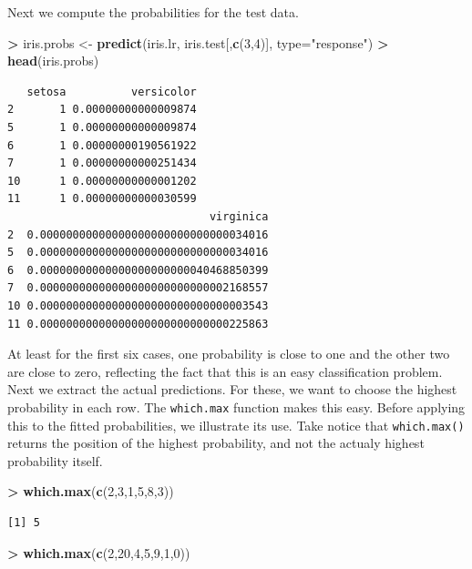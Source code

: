 \documentclass[]{krantz}
\makeatletter
\newenvironment{Shaded}{\begin{snugshade}}{\end{snugshade}}
\newcommand{\KeywordTok}[1]{\textcolor[rgb]{0.27,0.27,0.27}{\textbf{#1}}}
\newcommand{\DataTypeTok}[1]{\textcolor[rgb]{0.27,0.27,0.27}{#1}}
\newcommand{\DecValTok}[1]{\textcolor[rgb]{0.06,0.06,0.06}{#1}}
\newcommand{\StringTok}[1]{\textcolor[rgb]{0.5,0.5,0.5}{#1}}
\newcommand{\OperatorTok}[1]{\textcolor[rgb]{0.43,0.43,0.43}{\textbf{#1}}}
\newcommand{\NormalTok}[1]{#1}
\newenvironment{kframe}{%
\medskip{}
\setlength{\fboxsep}{.8em}
 \def\at@end@of@kframe{}%
 \ifinner\ifhmode%
  \def\at@end@of@kframe{\end{minipage}}%
  \begin{minipage}{\columnwidth}%
 \fi\fi%
 \def\FrameCommand##1{\hskip\@totalleftmargin \hskip-\fboxsep
 \colorbox{shadecolor}{##1}\hskip-\fboxsep
     \hskip-\linewidth \hskip-\@totalleftmargin \hskip\columnwidth}%
 \MakeFramed {\advance\hsize-\width
   \@totalleftmargin\z@ \linewidth\hsize
   \@setminipage}}%
 {\par\unskip\endMakeFramed%
 \at@end@of@kframe}
\renewenvironment{Shaded}{\begin{kframe}}{\end{kframe}}
\makeatother
\begin{document}
Next we compute the probabilities for the test data.

\begin{Shaded}
\begin{Highlighting}[]
\OperatorTok{>}\StringTok{ }\NormalTok{iris.probs <-}\StringTok{ }\KeywordTok{predict}\NormalTok{(iris.lr, iris.test[,}\KeywordTok{c}\NormalTok{(}\DecValTok{3}\NormalTok{,}\DecValTok{4}\NormalTok{)], }\DataTypeTok{type=}\StringTok{"response"}\NormalTok{)}
\OperatorTok{>}\StringTok{ }\KeywordTok{head}\NormalTok{(iris.probs)}
\end{Highlighting}
\end{Shaded}

\begin{verbatim}
   setosa          versicolor
2       1 0.00000000000009874
5       1 0.00000000000009874
6       1 0.00000000190561922
7       1 0.00000000000251434
10      1 0.00000000000001202
11      1 0.00000000000030599
                               virginica
2  0.00000000000000000000000000000034016
5  0.00000000000000000000000000000034016
6  0.00000000000000000000000040468850399
7  0.00000000000000000000000000002168557
10 0.00000000000000000000000000000003543
11 0.00000000000000000000000000000225863
\end{verbatim}

At least for the first six cases, one probability is close to one and
the other two are close to zero, reflecting the fact that this is an
easy classification problem. Next we extract the actual predictions. For
these, we want to choose the highest probability in each row. The
\texttt{which.max} function makes this easy. Before applying this to the
fitted probabilities, we illustrate its use. Take notice that
\texttt{which.max()} returns the position of the highest probability,
and not the actualy highest probability itself.

\begin{Shaded}
\begin{Highlighting}[]
\OperatorTok{>}\StringTok{ }\KeywordTok{which.max}\NormalTok{(}\KeywordTok{c}\NormalTok{(}\DecValTok{2}\NormalTok{,}\DecValTok{3}\NormalTok{,}\DecValTok{1}\NormalTok{,}\DecValTok{5}\NormalTok{,}\DecValTok{8}\NormalTok{,}\DecValTok{3}\NormalTok{))}
\end{Highlighting}
\end{Shaded}

\begin{verbatim}
[1] 5
\end{verbatim}

\begin{Shaded}
\begin{Highlighting}[]
\OperatorTok{>}\StringTok{ }\KeywordTok{which.max}\NormalTok{(}\KeywordTok{c}\NormalTok{(}\DecValTok{2}\NormalTok{,}\DecValTok{20}\NormalTok{,}\DecValTok{4}\NormalTok{,}\DecValTok{5}\NormalTok{,}\DecValTok{9}\NormalTok{,}\DecValTok{1}\NormalTok{,}\DecValTok{0}\NormalTok{))}
\end{Highlighting}
\end{Shaded}
\end{document}
